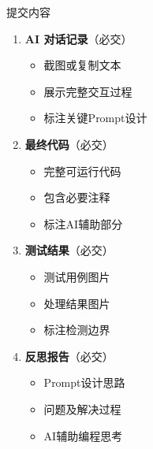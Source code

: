 \begin{frame}{提交内容}
	\begin{enumerate}
		\item \textbf{AI 对话记录}（必交）
		\begin{itemize}
			\item 截图或复制文本
			\item 展示完整交互过程
			\item 标注关键Prompt设计
		\end{itemize}

		\item \textbf{最终代码}（必交）
		\begin{itemize}
			\item 完整可运行代码
			\item 包含必要注释
			\item 标注AI辅助部分
		\end{itemize}

		\item \textbf{测试结果}（必交）
		\begin{itemize}
			\item 测试用例图片
			\item 处理结果图片
			\item 标注检测边界
		\end{itemize}

		\item \textbf{反思报告}（必交）
		\begin{itemize}
			\item Prompt设计思路
			\item 问题及解决过程
			\item AI辅助编程思考
		\end{itemize}
	\end{enumerate}
\end{frame}

